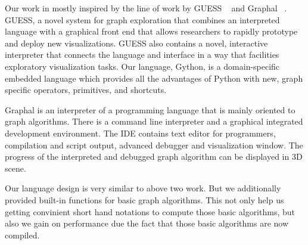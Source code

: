 Our work in mostly inspired by the line of work by GUESS ~\cite{Adar} and
Graphal ~\cite{Graphal}.
GUESS, a novel system for graph
exploration that combines an interpreted language with a
graphical front end that allows researchers to rapidly prototype
and deploy new visualizations. GUESS also contains a novel,
interactive interpreter that connects the language and interface in
a way that facilities exploratory visualization tasks. Our
language, Gython, is a domain-specific embedded language
which provides all the advantages of Python with new, graph
specific operators, primitives, and shortcuts.

Graphal is an interpreter of a programming language that is mainly oriented to
graph algorithms. There is a command line interpreter and a graphical
integrated development environment. The IDE contains text editor for
programmers, compilation and script output, advanced debugger and visualization
window. The progress of the interpreted and debugged graph algorithm can be
displayed in 3D scene.

Our language design is very similar to above two work. But we additionally provided
built-in functions for basic graph algorithms. This not only help us getting
convinient short hand notations to compute those basic algorithms, but also we gain on 
performance due the fact that those basic algorithms are now compiled.
